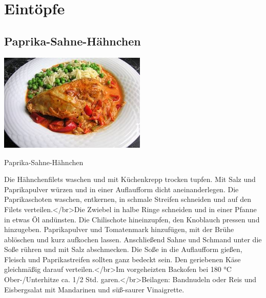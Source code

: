 \documentclass[12pt]{book}
\begin{document}
  \chapter{Eintöpfe}
\begin{mytextbox}
\end{mytextbox}
\newpage
	\begin{multicols}{2}
\begin{mytextbox}
  \section{Paprika-Sahne-Hähnchen}



  \begin{center}
    \includegraphics[width=7cm]{8d3eb2e33142426fff48e29184626861}
  \end{center}


  \begin{center}
    Paprika-Sahne-Hähnchen
  \end{center}

  Die Hähnchenfilets waschen und mit Küchenkrepp trocken tupfen. Mit Salz und Paprikapulver würzen und in einer Auflaufform dicht aneinanderlegen. Die Paprikaschoten waschen, entkernen, in schmale Streifen schneiden und auf den Filets verteilen.</br>Die Zwiebel in halbe Ringe schneiden und in einer Pfanne in etwas Öl andünsten. Die Chilischote hineinzupfen, den Knoblauch pressen und hinzugeben. Paprikapulver und Tomatenmark hinzufügen, mit der Brühe ablöschen und kurz aufkochen lassen. Anschließend Sahne und Schmand unter die Soße rühren und mit Salz abschmecken. Die Soße in die Auflaufform gießen, Fleisch und Paprikastreifen sollten ganz bedeckt sein. Den geriebenen Käse gleichmäßig darauf verteilen.</br>Im vorgeheizten Backofen bei 180 °C Ober-/Unterhitze ca. 1/2 Std. garen.</br>Beilagen: Bandnudeln oder Reis und Eisbergsalat mit Mandarinen und süß-saurer Vinaigrette.

\end{mytextbox}	\end{multicols}
\end{document}
